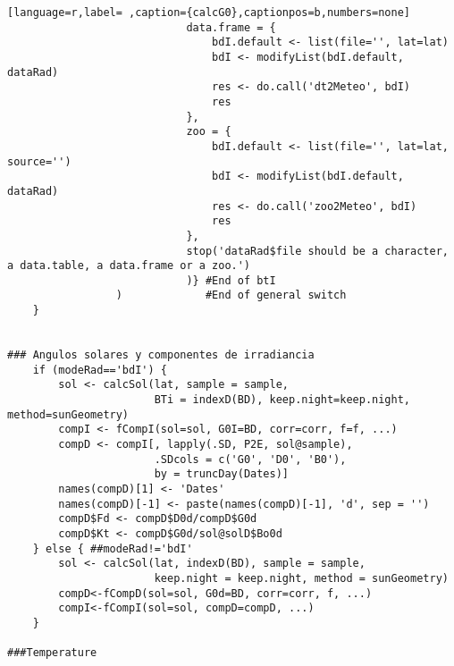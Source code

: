 \begin{lstlisting}[language=r,label= ,caption={calcG0},captionpos=b,numbers=none]
                            data.frame = {
                                bdI.default <- list(file='', lat=lat)
                                bdI <- modifyList(bdI.default, dataRad)
                                res <- do.call('dt2Meteo', bdI)
                                res
                            },
                            zoo = {
                                bdI.default <- list(file='', lat=lat, source='')
                                bdI <- modifyList(bdI.default, dataRad)
                                res <- do.call('zoo2Meteo', bdI)
                                res
                            },
                            stop('dataRad$file should be a character, a data.table, a data.frame or a zoo.')
                            )} #End of btI
                 )             #End of general switch    
    }


### Angulos solares y componentes de irradiancia
    if (modeRad=='bdI') {
        sol <- calcSol(lat, sample = sample,
                       BTi = indexD(BD), keep.night=keep.night, method=sunGeometry)
        compI <- fCompI(sol=sol, G0I=BD, corr=corr, f=f, ...)
        compD <- compI[, lapply(.SD, P2E, sol@sample),
                       .SDcols = c('G0', 'D0', 'B0'),
                       by = truncDay(Dates)]
        names(compD)[1] <- 'Dates'
        names(compD)[-1] <- paste(names(compD)[-1], 'd', sep = '')
        compD$Fd <- compD$D0d/compD$G0d
        compD$Kt <- compD$G0d/sol@solD$Bo0d
    } else { ##modeRad!='bdI'
        sol <- calcSol(lat, indexD(BD), sample = sample,
                       keep.night = keep.night, method = sunGeometry)
        compD<-fCompD(sol=sol, G0d=BD, corr=corr, f, ...)
        compI<-fCompI(sol=sol, compD=compD, ...)
    }

###Temperature


\end{lstlisting}
